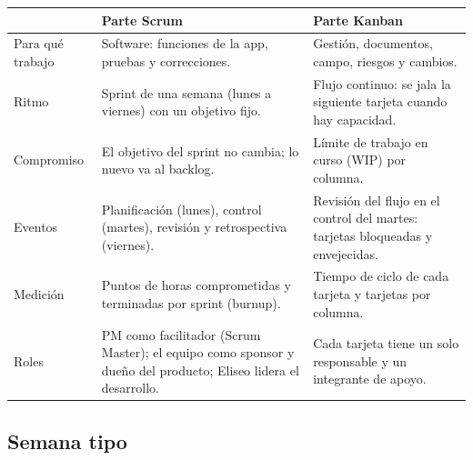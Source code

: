 \documentclass[11pt,a4paper]{article}
\begin{document}
\vspace{0.1cm}
{\small
{}
\noindent\begin{tabularx}{\textwidth}{@{}P{2.6cm} L L@{}}
\toprule
{}
& \textbf{Parte Scrum} & \textbf{Parte Kanban} \\
\midrule
Para qué trabajo & Software: funciones de la app, pruebas y correcciones. & Gestión, documentos, campo, riesgos y cambios. \\
Ritmo & Sprint de una semana (lunes a viernes) con un objetivo fijo. & Flujo continuo: se jala la siguiente tarjeta cuando hay capacidad. \\
Compromiso & El objetivo del sprint no cambia; lo nuevo va al backlog. & Límite de trabajo en curso (WIP) por columna. \\
Eventos & Planificación (lunes), control (martes), revisión y retrospectiva (viernes). & Revisión del flujo en el control del martes: tarjetas bloqueadas y envejecidas. \\
Medición & Puntos de horas comprometidas y terminadas por sprint (burnup). & Tiempo de ciclo de cada tarjeta y tarjetas por columna. \\
Roles & PM como facilitador (Scrum Master); el equipo como sponsor y dueño del producto; Eliseo lidera el desarrollo. & Cada tarjeta tiene un solo responsable y un integrante de apoyo. \\
\bottomrule
\end{tabularx}
}

\subsection{Semana tipo}
\begin{center}
\end{center}
\end{document}
